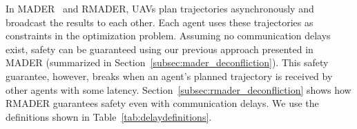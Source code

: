 \begin{figure}[t]
{
    }
    
  \label{fig:rmader_deconfliction}
\end{figure}

In MADER~\cite{tordesillas_mader_2022} and RMADER, UAVs plan trajectories asynchronously and broadcast the results to each other.  Each agent uses these trajectories as constraints in the optimization problem. Assuming no communication delays exist, safety can be guaranteed using our previous approach presented in MADER (summarized in Section~\ref{subsec:mader_deconfliction}). 
This safety guarantee, however, breaks when an agent's planned trajectory is received by other agents with some latency. Section~\ref{subsec:rmader_deconfliction} shows how RMADER guarantees safety even with communication delays. We use the definitions shown in Table~\ref{tab:delaydefinitions}.

